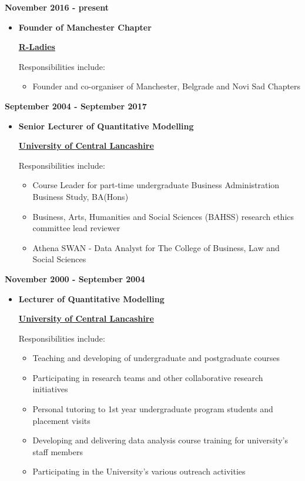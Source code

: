 \documentclass[
]{article}
\providecommand{\tightlist}{%
  \setlength{\itemsep}{0pt}\setlength{\parskip}{0pt}}
\begin{document}
\textbf{November 2016 - present}

\begin{itemize}
\item
  \textbf{Founder of Manchester Chapter}

  \href{https://rladies.org}{\textbf{R-Ladies}}

  Responsibilities include:

  \begin{itemize}
  \tightlist
  \item
    Founder and co-organiser of Manchester, Belgrade and Novi Sad
    Chapters
  \end{itemize}
\end{itemize}

\textbf{September 2004 - September 2017}

\begin{itemize}
\item
  \textbf{Senior Lecturer of Quantitative Modelling}

  \href{https://www.uclan.ac.uk}{\textbf{University of Central
  Lancashire}}

  Responsibilities include:

  \begin{itemize}
  \tightlist
  \item
    Course Leader for part-time undergraduate Business Administration
    Business Study, BA(Hons)
  \item
    Business, Arts, Humanities and Social Sciences (BAHSS) research
    ethics committee lead reviewer
  \item
    Athena SWAN - Data Analyst for The College of Business, Law and
    Social Sciences
  \end{itemize}
\end{itemize}

\textbf{November 2000 - September 2004}

\begin{itemize}
\item
  \textbf{Lecturer of Quantitative Modelling}

  \href{https://www.uclan.ac.uk}{\textbf{University of Central
  Lancashire}}

  Responsibilities include:

  \begin{itemize}
  \tightlist
  \item
    Teaching and developing of undergraduate and postgraduate courses
  \item
    Participating in research teams and other collaborative research
    initiatives
  \item
    Personal tutoring to 1st year undergraduate program students and
    placement visits
  \item
    Developing and delivering data analysis course training for
    university's staff members
  \item
    Participating in the University's various outreach activities
  \end{itemize}
\end{itemize}
\end{document}
